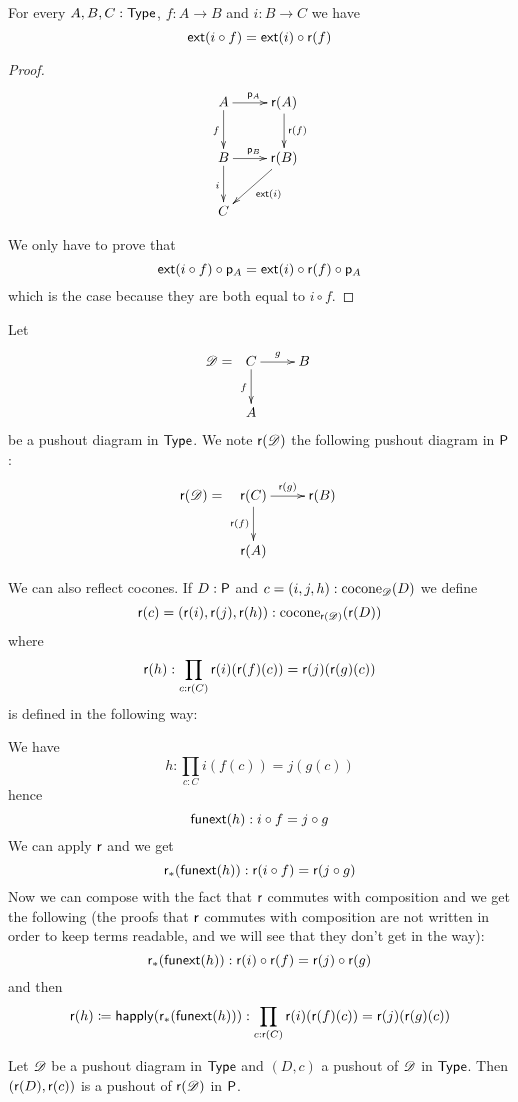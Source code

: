 \begin{lem}
  For every $A,B,C:\type$, $f:A\to{}B$ and $i:B\to{}C$ we have
  \[\ext(i\circ{}f)=\ext(i)\circ\reflect(f)\]
\end{lem}

\begin{proof}
  \[\xymatrix{A \ar^{\project_A}[r] \ar_f[d] & \reflect(A) \ar^{\reflect(f)}[d]
    \\
    B \ar^{\project_B}[r] \ar_i[d] & \reflect(B) \ar^{\ext(i)}[ld] \\
    C &}\]

  We only have to prove that
  \[\ext(i\circ{}f)\circ\project_A=\ext(i)\circ\reflect(f)\circ\project_A\]
  which is the case because they are both equal to $i\circ{}f$.
\end{proof}

\begin{defn}
  Let
  \[\Ddiag=\xymatrix{C \ar^g[r] \ar_f[d] & B \\ A & }\]
  be a pushout diagram in $\type$. We note $\reflect(\Ddiag)$ the following
  pushout diagram in $\P$:
  \[\reflect(\Ddiag)=\xymatrix{\reflect(C) \ar^{\reflect(g)}[r]
    \ar_{\reflect(f)}[d] & \reflect(B) \\ \reflect(A) & }\]

  We can also reflect cocones. If $D:\P$ and $c=(i,j,h):\cocone{\Ddiag}{D}$ we
  define
  \[\reflect(c)=(\reflect(i),\reflect(j),\reflect(h)):
  \cocone{\reflect(\Ddiag)}{\reflect(D)}\]
  where
  \[\reflect(h):\prod_{c:\reflect(C)}\reflect(i)(\reflect(f)(c))=\reflect(j)(\reflect(g)(c))\]
  is defined in the following way:

  We have \[h:\prod_{c:C}i(f(c))=j(g(c))\]
  hence
  \[\funext(h):i\circ{}f=j\circ{}g\]
  We can apply $\reflect$ and we get
  \[\mapfunc{\reflect}(\funext(h)):\reflect(i\circ{}f)=\reflect(j\circ{}g)\]
  Now we can compose with the fact that $\reflect$ commutes with composition and
  we get the following (the proofs that $\reflect$ commutes with composition are
  not written in order to keep terms readable, and we will see that they don’t
  get in the way):
  \[\mapfunc{\reflect}(\funext(h)):
  \reflect(i)\circ\reflect(f)=\reflect(j)\circ\reflect(g)\]
  and then
  \[\reflect(h)\defeq\happly(\mapfunc{\reflect}(\funext(h))):
  \prod_{c:\reflect(C)}\reflect(i)(\reflect(f)(c))=\reflect(j)(\reflect(g)(c))\]
\end{defn}

\begin{lem}
  \label{reflectcommutespushout}
  Let $\Ddiag$ be a pushout diagram in $\type$ and $(D,c)$ a pushout of $\Ddiag$
  in $\type$. Then $(\reflect(D),\reflect(c))$ is a pushout of
  $\reflect(\Ddiag)$ in $\P$.
\end{lem}

